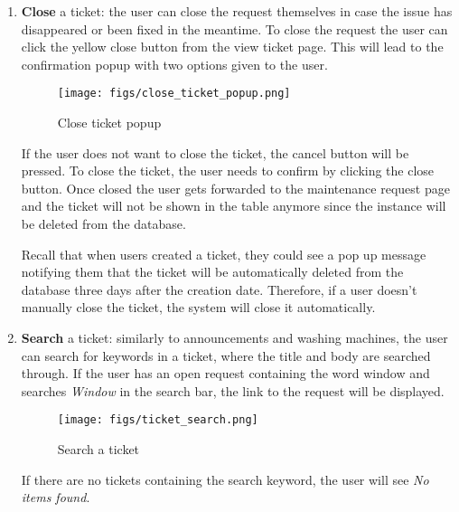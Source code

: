 \documentclass[conference]{IEEEtran}
\begin{document}
\begin{enumerate}
    \item \textbf{Close} a ticket: the user can close the request themselves in case the issue has disappeared or been fixed in the meantime. To close the request the user can click the yellow close button from the view ticket page. This will lead to the confirmation popup with two options given to the user.
    \begin{figure}[H]
    \centering
    \texttt{[image: figs/close\_ticket\_popup.png]}
    \caption{Close ticket popup}
    \label{fig:Close ticket popup}
    \end{figure}
    If the user does not want to close the ticket, the cancel button will be pressed. To close the ticket, the user needs to confirm by clicking the close button. Once closed the user gets forwarded to the maintenance request page and the ticket will not be shown in the table anymore since the instance will be deleted from the database.
    
    Recall that when users created a ticket, they could see a pop up message notifying them that the ticket will be automatically deleted from the database three days after the creation date. Therefore, if a user doesn’t manually close the ticket, the system will close it automatically.
    \item \textbf{Search} a ticket: similarly to announcements and washing machines, the user can search for keywords in a ticket, where the title and body are searched through. If the user has an open request containing the word window and searches \textit{Window} in the search bar, the link to the request will be displayed.
    \begin{figure}[H]
    \centering
    \texttt{[image: figs/ticket\_search.png]}
    \caption{Search a ticket}
    \label{fig:Search a ticket}
    \end{figure}
    If there are no tickets containing the search keyword, the user will see \textit{No items found}.
\end{enumerate}



\vspace{30mm}
\end{document}
